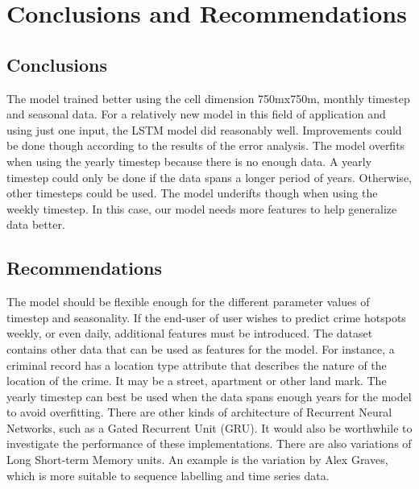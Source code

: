 
\chapter{Conclusions and Recommendations}  %

\section{Conclusions}
    The model trained better using the cell dimension 750mx750m, monthly timestep and seasonal data. For a relatively new model in this field of application and using just one input, the LSTM model did reasonably well. Improvements could be done though according to the results of the error analysis. The model overfits when using the yearly timestep because there is no enough data. A yearly timestep could only be done if the data spans a longer period of years. Otherwise, other timesteps could be used. The model underifts though when using the weekly timestep. In this case, our model needs more features to help generalize data better.
\section{Recommendations}
    The model should be flexible enough for the different parameter values of timestep and seasonality. If the end-user of user wishes to predict crime hotspots weekly, or even daily, additional features must be introduced. The dataset contains other data that can be used as features for the model. For instance, a criminal record has a location type attribute that describes the nature of the location of the crime. It may be a street, apartment or other land mark. The yearly timestep can best be used when the data spans enough years for the model to avoid overfitting.
    There are other kinds of architecture of Recurrent Neural Networks, such as a Gated Recurrent Unit (GRU). It would also be worthwhile to investigate the performance of these implementations.
    There are also variations of Long Short-term Memory units. An example is the variation by Alex Graves, which is more suitable to sequence labelling and time series data.